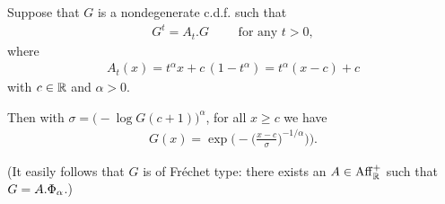 \begin{lemma}
  \label{lem:characterization-self-similar-family-pos-index}
  \leanok
  Suppose that $G$ is a nondegenerate c.d.f. such that
  \begin{align*}
    G^{t} = A_t . G \qquad \text{ for any } t > 0 ,
  \end{align*}
  where
  \begin{align*}
    A_t(x) = t^{\alpha} x + c \, (1 - t^{\alpha}) = t^{\alpha} (x-c) + c
  \end{align*}
  with $c \in \mathbb{R}$ and $\alpha > 0$.

  Then with $\sigma = \big(- \log G(c+1)\big)^{\alpha}$,
  for all $x \ge c$ we have
  \begin{align*}
    G(x) = \exp \Big( - \big( \frac{x - c}{\sigma} \big)^{-1/\alpha} \big) \Big) .
  \end{align*}

  (It easily follows that $G$ is of Fr\'echet type: there exists
  an $A \in \mathrm{Aff}^+_{\mathbb{R}}$ such that $G = A.\Phi_{\alpha}$.)
\end{lemma}
